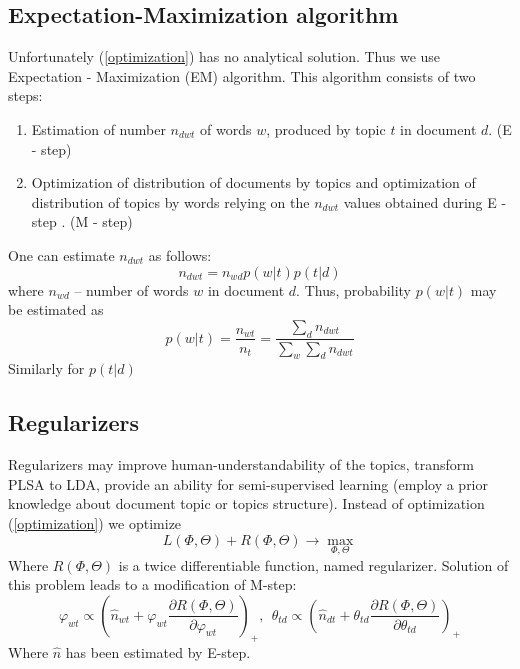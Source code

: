     \subsection{Expectation\--Maximization algorithm} \label{EMAlgorithm}
	    Unfortunately (\ref{optimization}) has no analytical solution. Thus we use Expectation \-- Maximization (EM) algorithm.
	    This algorithm consists of two steps:
	    \begin{enumerate}
		\item Estimation of number $n_{dwt}$ of words $w$, produced by topic $t$ in document $d$. (E \-- step)
		\item Optimization of distribution of documents by topics and optimization of distribution of topics by words relying on
		    the $n_{dwt}$ values obtained during E \-- step . (M \-- step)
	    \end{enumerate}
	    One can estimate $n_{dwt}$ as follows:
	    \begin{equation}  n_{dwt} = n_{wd} p(w|t) p(t|d) \end{equation}
	    where $n_{wd}$ \--- number of words $w$ in document $d$.
	    Thus, probability $p(w|t)$ may be estimated as
	    \begin{equation}  p(w|t) = \frac{n_{wt}}{n_t} = \frac{\sum_d n_{dwt} }{\sum_w \sum_d n_{dwt}}   \end{equation}
	    Similarly for $p(t|d)$

    \subsection{Regularizers} \label{Regularizers}
	Regularizers may improve human-understandability of the topics, transform PLSA to LDA, provide an ability
	for semi-supervised learning (employ a prior knowledge about document topic or topics structure).
	Instead of optimization (\ref{optimization}) we optimize
	\begin{equation} \label{optimizeWithReqularizer} L(\Phi, \Theta) + R(\Phi, \Theta) \to \max_{\Phi, \Theta} \end{equation}
	Where $R(\Phi, \Theta)$ is a twice differentiable function, named regularizer.
	Solution of this problem leads to a modification of M\--step:
	\begin{equation}
	    \label{RegularizersEquation}
	    \varphi_{wt} \propto \left(\hat{n}_{wt} + \varphi_{wt} \frac{\partial  R(\Phi, \Theta)}{\partial \varphi_{wt}} \right)_+ ,\ \
	    \theta_{td} \propto \left(\hat{n}_{dt} + \theta_{td}\frac{\partial  R(\Phi, \Theta)}{\partial \theta_{td}} \right)_+
	\end{equation}
	Where $\hat{n}$ has been estimated by E\--step.

